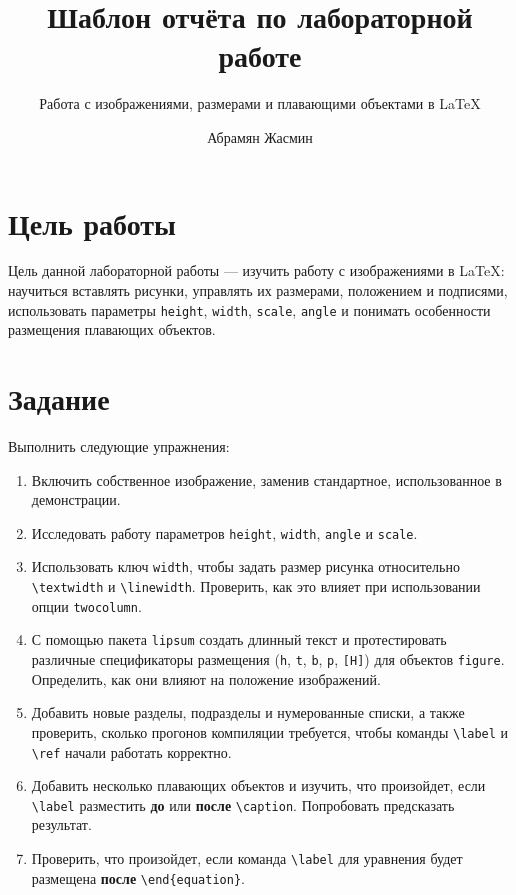 \documentclass[
  english,
  russian,
  12pt,
  a4paper,
  DIV=11,
  numbers=noendperiod]{scrreprt}
\title{Шаблон отчёта по лабораторной работе}
\subtitle{Работа с изображениями, размерами и плавающими объектами в
LaTeX}
\author{Абрамян Жасмин}
\date{}
\providecommand{\tightlist}{%
  \setlength{\itemsep}{0pt}\setlength{\parskip}{0pt}}
\renewcommand*\contentsname{Содержание}
\newcommand\contentsname{Содержание}
\begin{document}
\maketitle

\renewcommand*\contentsname{Содержание}
{
\setcounter{tocdepth}{1}
\tableofcontents
}
\listoffigures
\listoftables

\chapter{Цель
работы}\label{ux446ux435ux43bux44c-ux440ux430ux431ux43eux442ux44b}

Цель данной лабораторной работы --- изучить работу с изображениями в
LaTeX: научиться вставлять рисунки, управлять их размерами, положением и
подписями, использовать параметры \texttt{height}, \texttt{width},
\texttt{scale}, \texttt{angle} и понимать особенности размещения
плавающих объектов.

\chapter{Задание}\label{ux437ux430ux434ux430ux43dux438ux435}

Выполнить следующие упражнения:

\begin{enumerate}
\def\labelenumi{\arabic{enumi}.}
\tightlist
\item
  Включить собственное изображение, заменив стандартное, использованное
  в демонстрации.
\item
  Исследовать работу параметров \texttt{height}, \texttt{width},
  \texttt{angle} и \texttt{scale}.
\item
  Использовать ключ \texttt{width}, чтобы задать размер рисунка
  относительно \texttt{\textbackslash{}textwidth} и
  \texttt{\textbackslash{}linewidth}. Проверить, как это влияет при
  использовании опции \texttt{twocolumn}.
\item
  С помощью пакета \texttt{lipsum} создать длинный текст и
  протестировать различные спецификаторы размещения (\texttt{h},
  \texttt{t}, \texttt{b}, \texttt{p}, \texttt{{[}H{]}}) для объектов
  \texttt{figure}. Определить, как они влияют на положение изображений.
\item
  Добавить новые разделы, подразделы и нумерованные списки, а также
  проверить, сколько прогонов компиляции требуется, чтобы команды
  \texttt{\textbackslash{}label} и \texttt{\textbackslash{}ref} начали
  работать корректно.
\item
  Добавить несколько плавающих объектов и изучить, что произойдет, если
  \texttt{\textbackslash{}label} разместить \textbf{до} или
  \textbf{после} \texttt{\textbackslash{}caption}. Попробовать
  предсказать результат.
\item
  Проверить, что произойдет, если команда \texttt{\textbackslash{}label}
  для уравнения будет размещена \textbf{после}
  \texttt{\textbackslash{}end\{equation\}}.
\end{enumerate}
\end{document}

